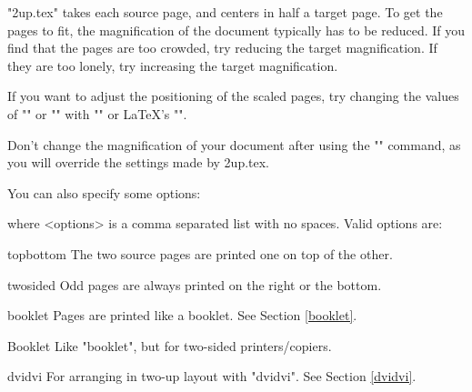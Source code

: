 \documentclass[12pt]{article}
\newcommand\namelistlabel[1]{\mbox{\bf #1}\hfil}
\newenvironment{namelist}[1]%
  {\begin{list}{}%
    {\let\makelabel\namelistlabel
    \settowidth{\labelwidth}{#1}
    \setlength{\leftmargin}{1.1\labelwidth}}}%
 {\end{list}}
\begin{document}
"2up.tex" takes each source page, and centers in half a target page. To get
the pages to fit, the magnification of the document typically has to be
reduced. If you find that the pages are too crowded, try reducing the target
magnification. If they are too lonely, try increasing the target
magnification.

If you want to adjust the positioning of the scaled pages, try changing the
values of "\hoffset" or "\voffset" with "\advance" or \LaTeX's "\addtolength".

Don't change the magnification of your document after using the "\target"
command, as you will override the settings made by 2up.tex.

You can also specify some options:
\begin{MD}
\end{MD}
where <options> is a comma separated list with no spaces. Valid
options are:
\begin{namelist}{topbottomxxx}

\item [topbottom] The two source pages are printed one on top of the other.
\item [twosided]  Odd pages are always printed on the right or the bottom.
\item [booklet]   Pages are printed like a booklet. See Section \ref{booklet}.
\item [Booklet]   Like "booklet", but for two-sided printers/copiers.
\item [dvidvi]    For arranging in two-up layout with "dvidvi". See Section
\ref{dvidvi}.

\end{namelist}
\end{document}
